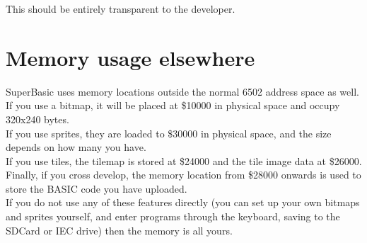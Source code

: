 This should be entirely transparent to the developer.

\section{Memory usage elsewhere}

SuperBasic uses memory locations outside the normal 6502 address space as well. \\

If you use a bitmap, it will be placed at \$10000 in physical space and occupy 320x240 bytes.\\

If you use sprites, they are loaded to \$30000 in physical space, and the size depends on how many you have.\\

If you use tiles, the tilemap is stored at \$24000 and the tile image data at \$26000. \\

Finally, if you cross develop, the memory location from \$28000 onwards is used to store the BASIC code you have uploaded.\\

If you do not use any of these features directly (you can set up your own bitmaps and sprites yourself, and enter programs through the keyboard, saving to the SDCard or IEC drive) then the memory is all yours.